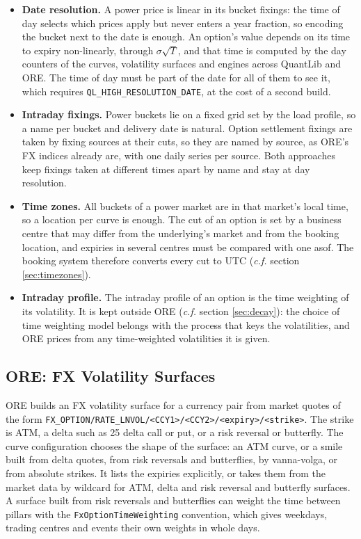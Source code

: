 \documentclass[12pt, a4paper]{article}
\begin{document}
\begin{itemize}
\item \textbf{Date resolution.} A power price is linear in its bucket fixings: the time of day selects which prices
  apply but never enters a year fraction, so encoding the bucket next to the date is enough. An option's value depends
  on its time to expiry non-linearly, through $\sigma\sqrt{T}$, and that time is computed by the day counters of the
  curves, volatility surfaces and engines across QuantLib and ORE. The time of day must be part of the date for all of
  them to see it, which requires \texttt{QL\_HIGH\_RESOLUTION\_DATE}, at the cost of a second build.
\item \textbf{Intraday fixings.} Power buckets lie on a fixed grid set by the load profile, so a name per bucket and
  delivery date is natural. Option settlement fixings are taken by fixing sources at their cuts, so they are named by
  source, as ORE's FX indices already are, with one daily series per source. Both approaches keep fixings taken at
  different times apart by name and stay at day resolution.
\item \textbf{Time zones.} All buckets of a power market are in that market's local time, so a location per curve is
  enough. The cut of an option is set by a business centre that may differ from the underlying's market and from the
  booking location, and expiries in several centres must be compared with one asof. The booking system therefore
  converts every cut to UTC (\textit{c.f.} section \ref{sec:timezones}).
\item \textbf{Intraday profile.} The intraday profile of an option is the time weighting of its volatility. It is kept outside
  ORE (\textit{c.f.} section \ref{sec:decay}): the choice of time weighting model belongs with the process that keys the volatilities, and ORE
  prices from any time-weighted volatilities it is given.
\end{itemize}

\subsection{ORE: FX Volatility Surfaces}\label{sec:sota-fx}

ORE builds an FX volatility surface for a currency pair from market quotes of the form
\texttt{FX\_OPTION/RATE\_LNVOL/<CCY1>/<CCY2>/<expiry>/<strike>}. The strike is ATM, a delta such as 25 delta call or
put, or a risk reversal or butterfly. The curve configuration chooses the shape of the surface: an ATM curve, or a smile
built from delta quotes, from risk reversals and butterflies, by vanna-volga, or from absolute strikes. It lists the
expiries explicitly, or takes them from the market data by wildcard for ATM, delta and risk reversal and butterfly
surfaces. A surface built from risk reversals and butterflies can weight the time between pillars with the
\texttt{FxOptionTimeWeighting} convention, which gives weekdays, trading centres and events their own weights in whole
days.
\end{document}
